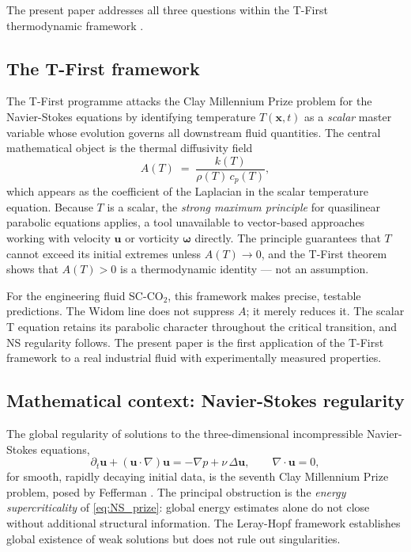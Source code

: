 \documentclass[12pt,a4paper]{article}
\newcommand{\sco}{SC-CO$_2$}
\begin{document}
The present paper addresses all three questions within the T-First thermodynamic
framework \citep{TFirst2026}.

\subsection{The T-First framework}
\label{sec:intro:tfirst}

The T-First programme \citep{TFirst2026} attacks the Clay Millennium Prize problem
for the Navier-Stokes equations by identifying temperature $T(\bm{x},t)$ as a
\emph{scalar} master variable whose evolution governs all downstream fluid quantities.
The central mathematical object is the thermal diffusivity field
\begin{equation}
  A(T) \;=\; \frac{k(T)}{\rho(T)\,c_p(T)},
  \label{eq:A_def}
\end{equation}
which appears as the coefficient of the Laplacian in the scalar temperature equation.
Because $T$ is a scalar, the \emph{strong maximum principle} for quasilinear
parabolic equations applies, a tool unavailable to vector-based approaches working
with velocity $\bm{u}$ or vorticity $\bm{\omega}$ directly.  The principle guarantees
that $T$ cannot exceed its initial extremes unless $A(T) \to 0$, and the T-First
theorem shows that $A(T) > 0$ is a thermodynamic identity --- not an assumption.

For the engineering fluid \sco{}, this framework makes precise, testable predictions.
The Widom line does not suppress $A$; it merely reduces it.  The scalar T equation
retains its parabolic character throughout the critical transition, and NS regularity
follows.  The present paper is the first application of the T-First framework to a
real industrial fluid with experimentally measured properties.

\subsection{Mathematical context: Navier-Stokes regularity}
\label{sec:intro:math}

The global regularity of solutions to the three-dimensional incompressible
Navier-Stokes equations,
\begin{equation}
  \partial_t \bm{u} + (\bm{u}\cdot\nabla)\bm{u}
  = -\nabla p + \nu\,\Delta\bm{u}, \qquad
  \nabla\cdot\bm{u} = 0,
  \label{eq:NS_prize}
\end{equation}
for smooth, rapidly decaying initial data, is the seventh Clay Millennium Prize
problem, posed by Fefferman \citep{Fefferman2000}.  The principal obstruction is
the \emph{energy supercriticality} of \eqref{eq:NS_prize}: global energy estimates
alone do not close without additional structural information.  The Leray-Hopf
framework \citep{Leray1934} establishes global existence of weak solutions but does
not rule out singularities.
\end{document}
